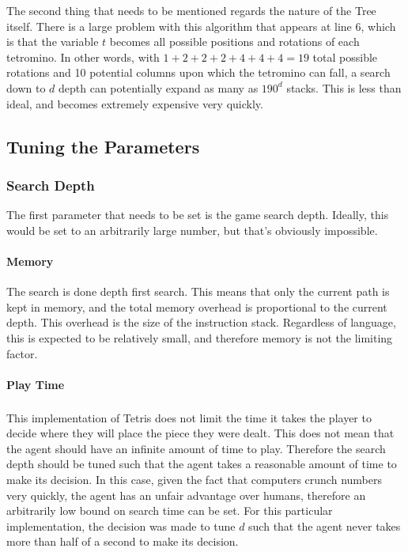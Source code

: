 \documentclass[fontsize=12pt]{article}
\def\tetris{Tetris\textsuperscript{\textregistered}}
\begin{document}
\par The second thing that needs to be mentioned regards the nature of the Tree itself. There is a large problem with this algorithm that appears at line 6, which is that the variable $t$ becomes all possible positions and rotations of each tetromino. In other words, with $1 + 2 + 2 + 2 + 4 + 4 + 4 = 19$ total possible rotations and 10 potential columns upon which the tetromino can fall, a search down to $d$ depth can potentially expand as many as $190^d$ stacks. This is less than ideal, and becomes extremely expensive very quickly.

\subsection{Tuning the Parameters}
\label{sub:tuning_the_parameters}

\subsubsection{Search Depth}
\label{ssub:search_depth}
\par The first parameter that needs to be set is the game search depth. Ideally, this would be set to an arbitrarily large number, but that's obviously impossible.
\paragraph{Memory}
\label{par:memory}
The search is done depth first search. This means that only the current path is kept in memory, and the total memory overhead is proportional to the current depth. This overhead is the size of the instruction stack. Regardless of language, this is expected to be relatively small, and therefore memory is not the limiting factor.

\paragraph{Play Time}
\label{par:play_time}
This implementation of \tetris{} does not limit the time it takes the player to decide where they will place the piece they were dealt. This does not mean that the agent should have an infinite amount of time to play. Therefore the search depth should be tuned such that the agent takes a reasonable amount of time to make its decision. In this case, given the fact that computers crunch numbers very quickly, the agent has an unfair advantage over humans, therefore an arbitrarily low bound on search time can be set. For this particular implementation, the decision was made to tune $d$ such that the agent never takes more than half of a second to make its decision.
\end{document}
